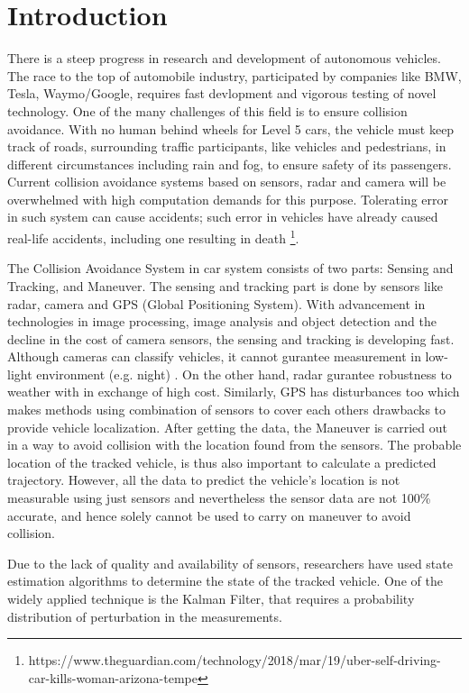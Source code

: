 \chapter{Introduction} \label{ch:intro}
There is a steep progress in research and development of autonomous vehicles. The race to the top of automobile industry, participated by companies like BMW, Tesla, Waymo/Google, requires fast devlopment and vigorous testing of novel technology. One of the many challenges of this field is to ensure collision avoidance. With no human behind wheels for Level 5 \cite{SAE2014} cars, the vehicle must keep track of roads, surrounding traffic participants, like vehicles and pedestrians, in different circumstances including rain and fog, to ensure safety of its passengers. Current collision avoidance systems based on sensors, radar and camera will be overwhelmed with high computation demands for this purpose. Tolerating error in such system can cause accidents; such error in vehicles have already caused real-life accidents, including one resulting in death \footnote{https://www.theguardian.com/technology/2018/mar/19/uber-self-driving-car-kills-woman-arizona-tempe}.


The Collision Avoidance System in car system consists of two parts: Sensing and Tracking, and Maneuver. The sensing and tracking part is done by sensors like radar, camera and GPS (Global Positioning System). With advancement in technologies in image processing, image analysis and object detection and the decline in the cost of camera sensors, the sensing and tracking is developing fast. Although cameras can classify vehicles, it cannot gurantee measurement in low-light environment (e.g. night) \cite{Hirz2018}. On the other hand, radar gurantee robustness to weather with in exchange of high cost. Similarly, GPS has disturbances too which makes methods using combination of sensors to cover each others drawbacks to provide vehicle localization. After getting the data, the Maneuver is carried out in a way to avoid collision with the location found from the sensors. The probable location of the tracked vehicle, is thus also important to calculate a predicted trajectory. However, all the data to predict the vehicle's location is not measurable using just sensors and nevertheless the sensor data are not 100\% accurate, and hence solely cannot be used to carry on maneuver to avoid collision.

Due to the lack of quality and availability of sensors, researchers have used state estimation algorithms to determine the state of the tracked vehicle. One of the widely applied technique is the Kalman Filter, that requires a probability distribution of perturbation in the measurements.  

